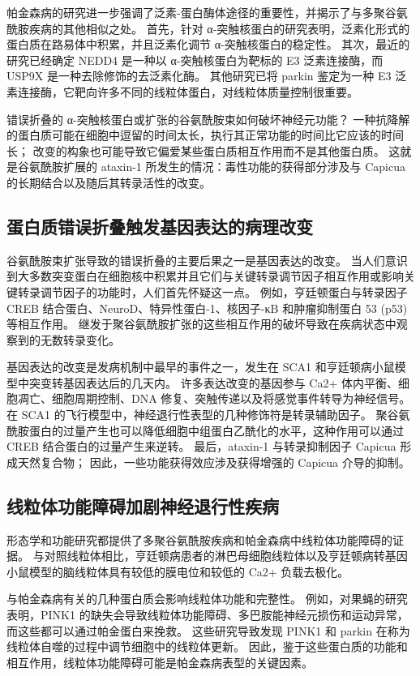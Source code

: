 帕金森病的研究进一步强调了泛素-蛋白酶体途径的重要性，并揭示了与多聚谷氨酰胺疾病的其他相似之处。 首先，针对 α-突触核蛋白的研究表明，泛素化形式的蛋白质在路易体中积累，并且泛素化调节 α-突触核蛋白的稳定性。 其次，最近的研究已经确定 NEDD4 是一种以 α-突触核蛋白为靶标的 E3 泛素连接酶，而 USP9X 是一种去除修饰的去泛素化酶。 其他研究已将 parkin 鉴定为一种 E3 泛素连接酶，它靶向许多不同的线粒体蛋白，对线粒体质量控制很重要。

错误折叠的 α-突触核蛋白或扩张的谷氨酰胺束如何破坏神经元功能？ 一种抗降解的蛋白质可能在细胞中逗留的时间太长，执行其正常功能的时间比它应该的时间长； 改变的构象也可能导致它偏爱某些蛋白质相互作用而不是其他蛋白质。 这就是谷氨酰胺扩展的 ataxin-1 所发生的情况：毒性功能的获得部分涉及与 Capicua 的长期结合以及随后其转录活性的改变。

\subsection{蛋白质错误折叠触发基因表达的病理改变}
谷氨酰胺束扩张导致的错误折叠的主要后果之一是基因表达的改变。 当人们意识到大多数突变蛋白在细胞核中积累并且它们与关键转录调节因子相互作用或影响关键转录调节因子的功能时，人们首先怀疑这一点。 例如，亨廷顿蛋白与转录因子 CREB 结合蛋白、NeuroD、特异性蛋白-1、核因子-κB 和肿瘤抑制蛋白 53 (p53) 等相互作用。 继发于聚谷氨酰胺扩张的这些相互作用的破坏导致在疾病状态中观察到的无数转录变化。

基因表达的改变是发病机制中最早的事件之一，发生在 SCA1 和亨廷顿病小鼠模型中突变转基因表达后的几天内。 许多表达改变的基因参与 Ca2+ 体内平衡、细胞凋亡、细胞周期控制、DNA 修复、突触传递以及将感觉事件转导为神经信号。 在 SCA1 的飞行模型中，神经退行性表型的几种修饰符是转录辅助因子。 聚谷氨酰胺蛋白的过量产生也可以降低细胞中组蛋白乙酰化的水平，这种作用可以通过 CREB 结合蛋白的过量产生来逆转。 最后，ataxin-1 与转录抑制因子 Capicua 形成天然复合物； 因此，一些功能获得效应涉及获得增强的 Capicua 介导的抑制。

\subsection{线粒体功能障碍加剧神经退行性疾病}
形态学和功能研究都提供了多聚谷氨酰胺疾病和帕金森病中线粒体功能障碍的证据。 与对照线粒体相比，亨廷顿病患者的淋巴母细胞线粒体以及亨廷顿病转基因小鼠模型的脑线粒体具有较低的膜电位和较低的 Ca2+ 负载去极化。

与帕金森病有关的几种蛋白质会影响线粒体功能和完整性。 例如，对果蝇的研究表明，PINK1 的缺失会导致线粒体功能障碍、多巴胺能神经元损伤和运动异常，而这些都可以通过帕金蛋白来挽救。 这些研究导致发现 PINK1 和 parkin 在称为线粒体自噬的过程中调节细胞中的线粒体更新。 因此，鉴于这些蛋白质的功能和相互作用，线粒体功能障碍可能是帕金森病表型的关键因素。

